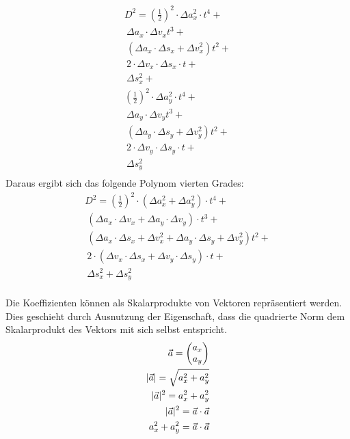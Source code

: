 \begin{multline}
    D^2 = (\frac{1}{2})^2 \cdot \Delta a_x^2 \cdot t^4 +\\\
    \Delta a_x \cdot \Delta v_x t^3 +\\\
    (\Delta a_x \cdot \Delta s_x + \Delta v_x^2) t^2 +\\\
    2 \cdot \Delta v_x \cdot \Delta s_x \cdot t +\\\
    \Delta s_x^2 +\\
    (\frac{1}{2})^2 \cdot \Delta a_y^2 \cdot t^4 +\\\
    \Delta a_y \cdot \Delta v_y t^3 +\\\
    (\Delta a_y \cdot \Delta s_y + \Delta v_y^2) t^2 +\\\
    2 \cdot \Delta v_y \cdot \Delta s_y \cdot t +\\\
    \Delta s_y^2\\
\end{multline}
Daraus ergibt sich das folgende Polynom vierten Grades:
\begin{multline}
    D^2 = (\frac{1}{2})^2 \cdot (\Delta a_x^2 + \Delta a_y^2) \cdot t^4 +\\\
    (\Delta a_x \cdot \Delta v_x + \Delta a_y \cdot \Delta v_y) \cdot t^3 +\\\
    (\Delta a_x \cdot \Delta s_x + \Delta v_x^2 + \Delta a_y \cdot \Delta s_y + \Delta v_y^2) t^2 +\\\
    2 \cdot (\Delta v_x \cdot \Delta s_x + \Delta v_y \cdot \Delta s_y) \cdot t +\\\
    \Delta s_x^2 + \Delta s_y^2\label{eq:dynamic_object_collision_event:03}\\\
\end{multline}

Die Koeffizienten können als Skalarprodukte von Vektoren repräsentiert werden. Dies geschieht durch Ausnutzung der
Eigenschaft, dass die quadrierte Norm dem Skalarprodukt des Vektors mit sich selbst entspricht.
\begin{align}
    \vec{a} = \begin{pmatrix}a_x\\a_y\end{pmatrix}\\
    \lvert \vec{a} \rvert = \sqrt{a_x^2 + a_y^2}\\
    \lvert \vec{a} \rvert^2 = a_x^2 + a_y^2\\
    \lvert \vec{a} \rvert^2 = \vec{a} \cdot \vec{a}\\
    a_x^2 + a_y^2 = \vec{a} \cdot \vec{a}\label{eq:dynamic_object_collision_event:04}
 \end{align}

